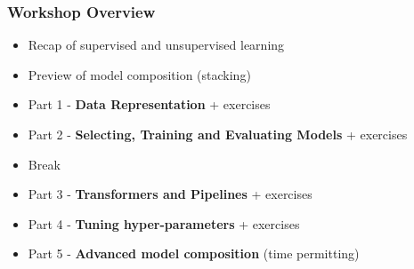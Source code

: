 \documentclass[t]{beamer}
\newcommand\df{\bf\color{Maroon}}
\begin{document}


\begin{frame}
  \frametitle{Workshop Overview}
  \begin{itemize}

  \item Recap of supervised and unsupervised learning

  \item Preview of model composition (stacking)

  \item Part 1 - {\df Data Representation} + exercises

  \item Part 2 - {\df Selecting, Training and Evaluating Models} + exercises

  \item  Break 

  \item Part 3 - {\df Transformers and Pipelines} + exercises

  \item Part 4 - {\df Tuning hyper-parameters} + exercises

  \item Part 5 - {\df Advanced model composition} (time permitting)

  \end{itemize}
\end{frame}
\end{document}
